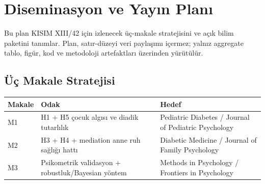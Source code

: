 \documentclass[
  turkish,
  12pt,
  a4paper,
]{report}
\author{}
\date{}
\newcounter{none} %
\renewcommand*\contentsname{İçindekiler}
\newcommand\contentsname{İçindekiler}
\renewcommand*\listfigurename{Şekil Listesi}
\newcommand\listfigurename{Şekil Listesi}
\renewcommand*\listtablename{Tablo Listesi}
\newcommand\listtablename{Tablo Listesi}
\begin{document}
\renewcommand{\listfigurename}{ŞEKİLLER DİZİNİ}
\renewcommand{\listtablename}{TABLOLAR DİZİNİ}

\renewcommand*\contentsname{İÇİNDEKİLER}
{
\hypersetup{linkcolor=black}
\setcounter{tocdepth}{2}
\tableofcontents
}
\listoffigures
\listoftables

\chapter{Diseminasyon ve Yayın
Planı}\label{diseminasyon-ve-yayux131n-planux131}

Bu plan KISIM XIII/42 için izlenecek üç-makale stratejisini ve açık
bilim paketini tanımlar. Plan, satır-düzeyi veri paylaşımı içermez;
yalnız aggregate tablo, figür, kod ve metodoloji artefaktları üzerinden
yürütülür.

\section{Üç Makale Stratejisi}\label{uxfcuxe7-makale-stratejisi}

{\def\LTcaptype{none} %
\begin{longtable}[]{@{}
  >{\raggedright\arraybackslash}p{}
  >{\raggedright\arraybackslash}p{}
  >{\raggedright\arraybackslash}p{}@{}}
\toprule\noalign{}
\begin{minipage}[b]{\linewidth}\raggedright
Makale
\end{minipage} & \begin{minipage}[b]{\linewidth}\raggedright
Odak
\end{minipage} & \begin{minipage}[b]{\linewidth}\raggedright
Hedef
\end{minipage} \\
\midrule\noalign{}
\endhead
\bottomrule\noalign{}
\endlastfoot
M1 & H1 + H5 çocuk algısı ve diadik tutarlılık & Pediatric Diabetes /
Journal of Pediatric Psychology \\
M2 & H3 + H4 + mediation anne ruh sağlığı hattı & Diabetic Medicine /
Journal of Family Psychology \\
M3 & Psikometrik validasyon + robustluk/Bayesian yöntem & Methods in
Psychology / Frontiers in Psychology \\
\end{longtable}
}
\end{document}
